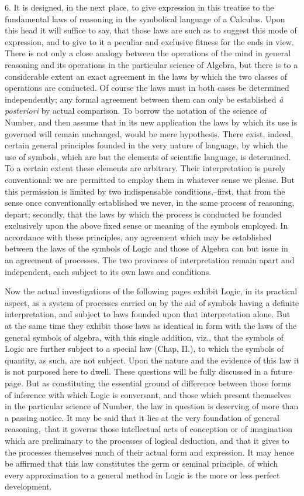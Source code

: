 \documentclass[oneside]{book}
\begin{document}
6. It is designed, in the next place, to give expression in this
treatise to the fundamental laws of reasoning in the symbolical
language of a Calculus. Upon this head it will suffice to say, that
those laws are such as to suggest this mode of expression, and
to give to it a peculiar and exclusive fitness for the ends in view.
There is not only a close analogy between the operations of the
mind in general reasoning and its operations in the particular
science of Algebra, but there is to a considerable extent an exact
agreement in the laws by which the two classes of operations are
conducted. Of course the laws must in both cases be determined
independently; any formal agreement between them can only be
established \textit{\`{a} posteriori} by actual comparison. To borrow the
notation of the science of Number, and then assume that in its
new application the laws by which its use is governed will remain
unchanged, would be mere hypothesis. There exist, indeed,
certain general principles founded in the very nature of language,
by which the use of symbols, which are but the elements of
scientific language, is determined. To a certain extent these
elements are arbitrary. Their interpretation is purely conventional:
we are permitted to employ them in whatever sense we
please. But this permission is limited by two indispensable conditions,--first,
that from the sense once conventionally established
we never, in the same process of reasoning, depart; secondly,
that the laws by which the process is conducted be founded exclusively
upon the above fixed sense or meaning of the symbols
employed. In accordance with these principles, any agreement
which may be established between the laws of the symbols of
Logic and those of Algebra can but issue in an agreement of processes.
The two provinces of interpretation remain apart and
independent, each subject to its own laws and conditions.

Now the actual investigations of the following pages exhibit
Logic, in its practical aspect, as a system of processes carried on
by the aid of symbols having a definite interpretation, and subject
to laws founded upon that interpretation alone. But at the
same time they exhibit those laws as identical in form with the
laws of the general symbols of algebra, with this single addition,
viz., that the symbols of Logic are further subject to a special
law (Chap, II.), to which the symbols of quantity, as such, are
not subject. Upon the nature and the evidence of this law it is not
purposed here to dwell. These questions will be fully discussed
in a future page. But as constituting the essential ground of
difference between those forms of inference with which Logic is
conversant, and those which present themselves in the particular
science of Number, the law in question is deserving of more
than a passing notice. It may be said that it lies at the very
foundation of general reasoning,--that it governs those intellectual
acts of conception or of imagination which are preliminary to
the processes of logical deduction, and that it gives to the processes
themselves much of their actual form and expression. It
may hence be affirmed that this law constitutes the germ or seminal
principle, of which every approximation to a general method
in Logic is the more or less perfect development.
\end{document}
